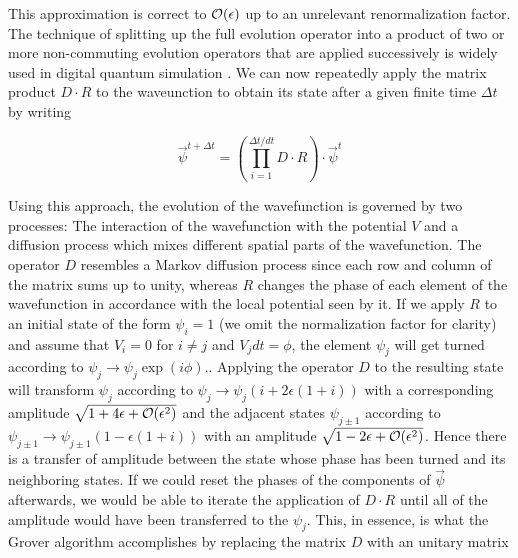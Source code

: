 This approximation is correct to $\begin{mathcal}O\end{mathcal}(\epsilon)$ up to an unrelevant renormalization factor. The technique of splitting up the full evolution operator into a product of two or more non-commuting evolution operators that are applied successively is widely used in digital quantum simulation \citep{lloyd_universal_1996,lanyon_universal_2011}. We can now repeatedly apply the matrix product $D\cdot R$ to the waveunction to obtain its state after a given finite time $\Delta t$ by writing

\begin{equation}
\vec{\psi}^{t+\Delta t} = \left(\prod\limits_{i = 1}^{\Delta t/dt} D\cdot R\right)\cdot \vec{\psi}^{t}
\end{equation}

Using this approach, the evolution of the wavefunction is governed by two processes: The interaction of the wavefunction with the potential $V$ and a diffusion process which mixes different spatial parts of the wavefunction. The operator $D$ resembles a Markov diffusion process since each row and column of the matrix sums up to unity, whereas $R$ changes the phase of each element of the wavefunction in accordance with the local potential seen by it. If we apply $R$ to an initial state of the form $\psi_i = 1$ (we omit the normalization factor for clarity) and assume that $V_i = 0$ for $i \ne j$ and $V_j dt = \phi$, the element $\psi_j$ will get turned according to $\psi_j \to \psi_j \exp{\left(i\phi\right)}$.. Applying the operator $D$ to the resulting state will transform $\psi_j$ according to $\psi_j \to \psi_j(i+2\epsilon(1+i))$ with a corresponding amplitude $\sqrt{1+4\epsilon+\begin{mathcal}O\end{mathcal}(\epsilon^2)}$ and the adjacent states $\psi_{j\pm 1}$ according to $\psi_{j\pm 1} \to \psi_{j\pm 1}(1-\epsilon(1+i))$ with an amplitude $\sqrt{1-2\epsilon +\begin{mathcal}O\end{mathcal}(\epsilon^2)}$. Hence there is a transfer of amplitude between the state whose phase has been turned and its neighboring states. If we could reset the phases of the components of $\vec{\psi}$ afterwards, we would be able to iterate the application of $D\cdot R$ until all of the amplitude would have been transferred to the $\psi_j$. This, in essence, is what the Grover algorithm accomplishes by replacing the matrix $D$ with an unitary matrix 

